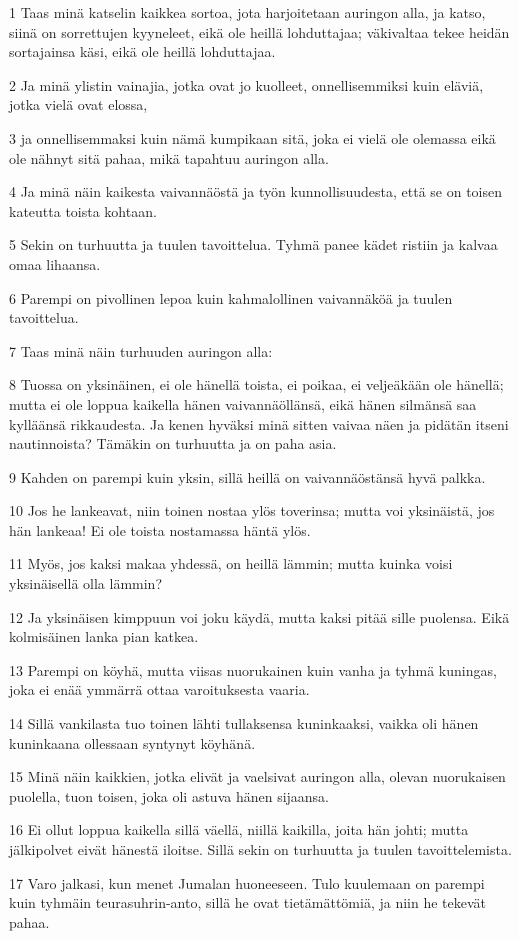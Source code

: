 \par 1 Taas minä katselin kaikkea sortoa, jota harjoitetaan auringon alla, ja katso, siinä on sorrettujen kyyneleet, eikä ole heillä lohduttajaa; väkivaltaa tekee heidän sortajainsa käsi, eikä ole heillä lohduttajaa.
\par 2 Ja minä ylistin vainajia, jotka ovat jo kuolleet, onnellisemmiksi kuin eläviä, jotka vielä ovat elossa,
\par 3 ja onnellisemmaksi kuin nämä kumpikaan sitä, joka ei vielä ole olemassa eikä ole nähnyt sitä pahaa, mikä tapahtuu auringon alla.
\par 4 Ja minä näin kaikesta vaivannäöstä ja työn kunnollisuudesta, että se on toisen kateutta toista kohtaan.
\par 5 Sekin on turhuutta ja tuulen tavoittelua. Tyhmä panee kädet ristiin ja kalvaa omaa lihaansa.
\par 6 Parempi on pivollinen lepoa kuin kahmalollinen vaivannäköä ja tuulen tavoittelua.
\par 7 Taas minä näin turhuuden auringon alla:
\par 8 Tuossa on yksinäinen, ei ole hänellä toista, ei poikaa, ei veljeäkään ole hänellä; mutta ei ole loppua kaikella hänen vaivannäöllänsä, eikä hänen silmänsä saa kylläänsä rikkaudesta. Ja kenen hyväksi minä sitten vaivaa näen ja pidätän itseni nautinnoista? Tämäkin on turhuutta ja on paha asia.
\par 9 Kahden on parempi kuin yksin, sillä heillä on vaivannäöstänsä hyvä palkka.
\par 10 Jos he lankeavat, niin toinen nostaa ylös toverinsa; mutta voi yksinäistä, jos hän lankeaa! Ei ole toista nostamassa häntä ylös.
\par 11 Myös, jos kaksi makaa yhdessä, on heillä lämmin; mutta kuinka voisi yksinäisellä olla lämmin?
\par 12 Ja yksinäisen kimppuun voi joku käydä, mutta kaksi pitää sille puolensa. Eikä kolmisäinen lanka pian katkea.
\par 13 Parempi on köyhä, mutta viisas nuorukainen kuin vanha ja tyhmä kuningas, joka ei enää ymmärrä ottaa varoituksesta vaaria.
\par 14 Sillä vankilasta tuo toinen lähti tullaksensa kuninkaaksi, vaikka oli hänen kuninkaana ollessaan syntynyt köyhänä.
\par 15 Minä näin kaikkien, jotka elivät ja vaelsivat auringon alla, olevan nuorukaisen puolella, tuon toisen, joka oli astuva hänen sijaansa.
\par 16 Ei ollut loppua kaikella sillä väellä, niillä kaikilla, joita hän johti; mutta jälkipolvet eivät hänestä iloitse. Sillä sekin on turhuutta ja tuulen tavoittelemista.
\par 17 Varo jalkasi, kun menet Jumalan huoneeseen. Tulo kuulemaan on parempi kuin tyhmäin teurasuhrin-anto, sillä he ovat tietämättömiä, ja niin he tekevät pahaa.

